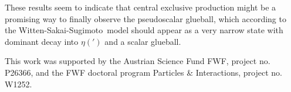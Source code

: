 \documentclass[a4paper]{PoS}
\newcommand{\6}{\partial }
\newcommand{\8}{T_{\rm D8}}
\def\WSS{Witten-Sakai-Sugimoto}
\begin{document}
These results seem to indicate that central exclusive production might be a promising way to finally observe the pseudoscalar glueball,
which according to the \WSS\ model should appear as a very narrow state with dominant decay into $\eta(')$ and a scalar glueball.

\begin{acknowledgments}
This work was supported by the Austrian Science
Fund FWF, project no. P26366, and the FWF doctoral program
Particles \& Interactions, project no. W1252.
\end{acknowledgments}


% 

%

\end{document}
